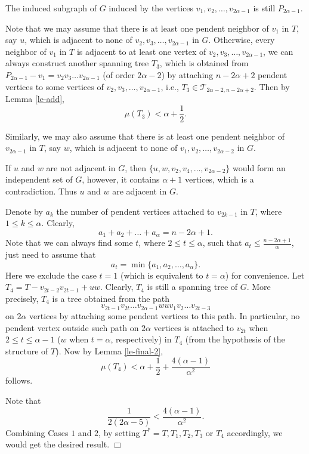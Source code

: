 \documentclass[12pt]{article}
\newenvironment {Proof} {\noindent {\bf Proof.}}{\hspace*{\fill}$\Box$\par\vspace{4mm}}
\begin{document}
\begin{Proof}
 The induced subgraph of $G$ induced by the vertices $v_1, v_2, \dots, v_{2\alpha-1}$ is still $P_{2\alpha-1}$.

Note that we may assume that there is at least one pendent neighbor of $v_1$ in $T$, say $u$, which is adjacent to none of $v_2, v_3, \dots, v_{2\alpha-1}$ in $G$. Otherwise,
every neighbor of $v_1$ in $T$ is adjacent to at least one vertex of $v_2, v_3, \dots, v_{2\alpha-1}$,
we can always construct another spanning tree $T_3$, which is obtained from $P_{2\alpha-1}- v_1 = v_2 v_3 \dots v_{2\alpha-1}$ (of order $2\alpha-2$) by attaching $n - 2\alpha + 2$ pendent vertices to some vertices of $ v_2, v_3, \dots, v_{2\alpha-1}$, i.e., $T_3 \in \mathcal{T}_{2\alpha-2,n - 2\alpha + 2}$. Then by Lemma \ref{le-add},
$$
\mu (T_3) < \alpha + \frac{1}{2}.
$$

Similarly, we may also assume that there is at least one pendent neighbor of $v_{2\alpha-1}$ in $T$, say $w$, which is adjacent to none of $v_1, v_2, \dots, v_{2\alpha-2}$ in $G$.

If $u$ and $w$ are not adjacent in $G$, then $\{u, w, v_2, v_4, \dots, v_{2\alpha-2}\}$ would form an independent set of $G$, however, it contains $\alpha + 1$ vertices, which is a contradiction. Thus $u$ and $w$ are adjacent in $G$.

Denote by $a_k$ the number of pendent vertices attached to $v_{2k-1}$ in $T$, where $1 \le k \le \alpha$. Clearly,
$$
a_1 + a_2 + \dots + a_{\alpha} = n - 2 \alpha + 1.
$$
Note that we can always find some $t$, where $2 \le t \le \alpha$, such that $a_t \le \frac{n - 2 \alpha + 1}{\alpha}$, just need to assume that
$$
a_t = \min \{ a_1, a_2, \dots, a_{\alpha} \}.
$$
Here we exclude the case $t = 1$ (which is equivalent to $t = \alpha$) for convenience.
Let $T_4 = T - v_{2t - 2} v_{2t - 1} + u w$. Clearly, $T_4$ is still a spanning tree of $G$. More precisely, $T_4$ is a tree obtained from the path
$$
v_{2t-1} v_{2t} \dots v_{2\alpha - 1} w u v_1 v_2 \dots v_{2t - 3}
$$
on $2\alpha$ vertices by attaching some pendent vertices to this path. In particular, no pendent vertex outside such path on $2\alpha$ vertices is attached to $v_{2t}$ when $2 \le t \le \alpha -1$ ($w$ when $t = \alpha$, respectively) in $T_4$ (from the hypothesis of the structure of $T$). Now by Lemma \ref{le-final-2},
$$
\mu (T_4) < \alpha + \frac{1}{2} + \frac{4(\alpha-1)}{\alpha^2}
$$
follows.


Note that
$$
\frac{1}{2(2\alpha-5)} < \frac{4(\alpha-1)}{\alpha^2}.
$$
Combining Cases $1$ and $2$, by setting $T^* = T, T_1, T_2, T_3$ or $T_4$ accordingly, we would get the desired result.
\end{Proof}
\end{document}
